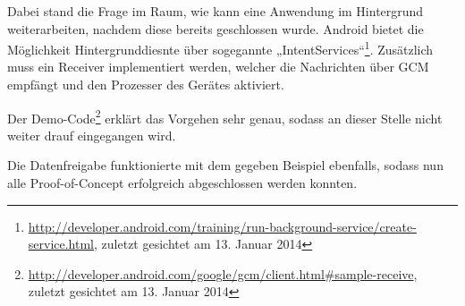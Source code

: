 Dabei stand die Frage im Raum, wie kann eine Anwendung im Hintergrund weiterarbeiten, nachdem diese bereits geschlossen wurde. Android bietet die Möglichkeit Hintergrunddiesnte über sogegannte „IntentServices“\footnote{\url{http://developer.android.com/training/run-background-service/create-service.html}, zuletzt gesichtet am 13. Januar 2014}. Zusätzlich muss ein Receiver implementiert werden, welcher die Nachrichten über GCM empfängt und den Prozesser des Gerätes aktiviert.

Der Demo-Code\footnote{\url{http://developer.android.com/google/gcm/client.html\#sample-receive}, zuletzt gesichtet am 13. Januar 2014} erklärt das Vorgehen sehr genau, sodass an dieser Stelle nicht weiter drauf eingegangen wird.

Die Datenfreigabe funktionierte mit dem gegeben Beispiel ebenfalls, sodass nun alle Proof-of-Concept erfolgreich abgeschlossen werden konnten.

